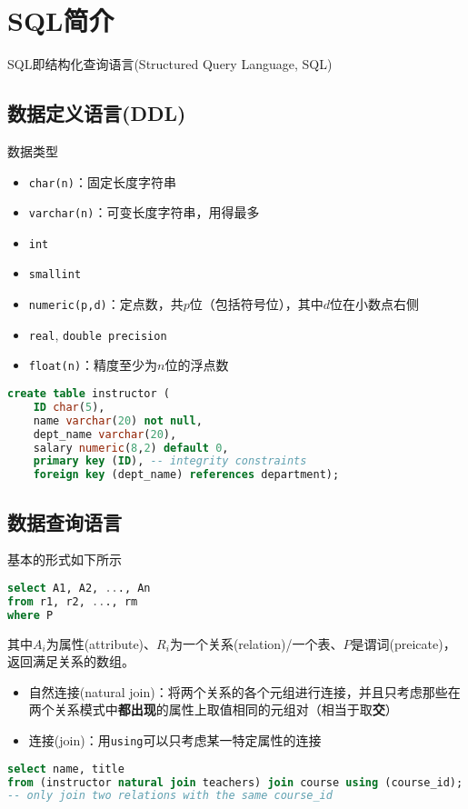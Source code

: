 
\section{SQL简介} %
SQL即结构化查询语言(Structured Query Language, SQL)

\subsection{数据定义语言(DDL)}
数据类型
\begin{itemize}
	\item \verb'char(n)'：固定长度字符串
	\item \verb'varchar(n)'：可变长度字符串，用得最多
	\item \verb'int'
	\item \verb'smallint'
	\item \verb'numeric(p,d)'：定点数，共$p$位（包括符号位），其中$d$位在小数点右侧
	\item \verb'real', \verb'double precision'
	\item \verb'float(n)'：精度至少为$n$位的浮点数
\end{itemize}
\begin{lstlisting}[language=sql]
create table instructor (
	ID char(5),
	name varchar(20) not null,
	dept_name varchar(20),
	salary numeric(8,2) default 0,
	primary key (ID), -- integrity constraints
	foreign key (dept_name) references department);
\end{lstlisting}

\subsection{数据查询语言}
基本的形式如下所示
\begin{lstlisting}[language=sql]
select A1, A2, ..., An
from r1, r2, ..., rm
where P
\end{lstlisting}
其中$A_i$为属性(attribute)、$R_i$为一个关系(relation)/一个表、$P$是谓词(preicate)，返回满足关系的数组。

\begin{itemize}
	\item 自然连接(natural join)：将两个关系的各个元组进行连接，并且只考虑那些在两个关系模式中\textbf{都出现}的属性上取值相同的元组对（相当于取\textbf{交}）
	\item 连接(join)：用\verb'using'可以只考虑某一特定属性的连接
\end{itemize}
\begin{lstlisting}[language=sql]
select name, title
from (instructor natural join teachers) join course using (course_id);
-- only join two relations with the same course_id
\end{lstlisting}

